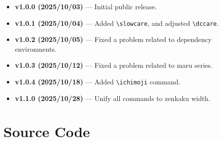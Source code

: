 \documentclass[luatex,fontsize=10pt,paper=b5,twoside]{jlreq}%
\begin{document}
\begin{itemize}
    \item \textbf{v1.0.0 (2025/10/03)} --- Initial public release.
    \item \textbf{v1.0.1 (2025/10/04)} --- Added \verb|\slowcare|, and adjusted \verb|\dccare|.
    \item \textbf{v1.0.2 (2025/10/05)} --- Fixed a problem related to dependency environments.
    \item \textbf{v1.0.3 (2025/10/12)} --- Fixed a problem related to maru series.
    \item \textbf{v1.0.4 (2025/10/18)} --- Added \verb|\ichimoji| command.
    \item \textbf{v1.1.0 (2025/10/28)} --- Unify all commands to zenkaku width.
\end{itemize}

\section{Source Code}
\end{document}
